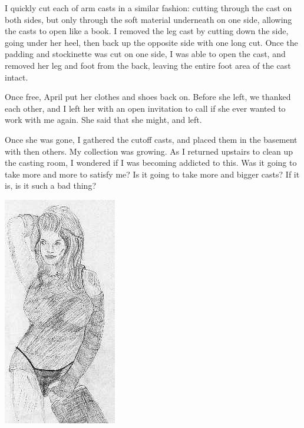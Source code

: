 I quickly cut each of arm casts in a similar fashion: cutting through the cast on both sides,
but only through the soft material underneath on one side, allowing the casts to open like a
book. I removed the leg cast by cutting down the side, going under her heel, then back up the
opposite side with one long cut. Once the padding and stockinette was cut on one side, I was
able to open the cast, and removed her leg and foot from the back, leaving the entire foot area
of the cast intact.

Once free, April put her clothes and shoes back on. Before she left, we thanked each other, and
I left her with an open invitation to call if she ever wanted to work with me again. She said
that she might, and left.

Once she was gone, I gathered the cutoff casts, and placed them in the basement with then
others. My collection was growing. As I returned upstairs to clean up the casting room, I
wondered if I was becoming addicted to this. Was it going to take more and more to satisfy me?
Is it going to take more and bigger casts? If it is, is it such a bad thing?

\newpage
\begin{center}
\includegraphics{images/kicks07.jpg}
\end{center}
